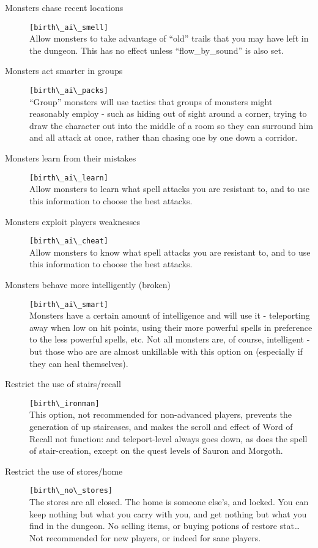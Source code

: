 \begin{description}
\item[Monsters chase recent locations] \verb+[birth\_ai\_smell]+\\
     Allow monsters to take advantage of ``old'' trails that you may have left
     in the dungeon. This has no effect unless ``flow\_by\_sound'' is also set.

\item[Monsters act smarter in groups] \verb+[birth\_ai\_packs]+\\
     ``Group'' monsters will use tactics that groups of monsters might
     reasonably employ - such as hiding out of sight around a corner,
     trying to draw the character out into the middle of a room so they
     can surround him and all attack at once, rather than chasing one
     by one down a corridor.

\item[Monsters learn from their mistakes] \verb+[birth\_ai\_learn]+\\
     Allow monsters to learn what spell attacks you are resistant to,
     and to use this information to choose the best attacks.

\item[Monsters exploit players weaknesses] \verb+[birth\_ai\_cheat]+\\
     Allow monsters to know what spell attacks you are resistant to,
     and to use this information to choose the best attacks.

 \item[Monsters behave more intelligently (broken)]
 \verb+[birth\_ai\_smart]+\\
     Monsters have a certain amount of intelligence and will use it -
     teleporting away when low on hit points, using their more powerful
     spells in preference to the less powerful spells, etc. Not all
     monsters are, of course, intelligent - but those who are are almost
     unkillable with this option on (especially if they can heal
     themselves).

\item[Restrict the use of stairs/recall] \verb+[birth\_ironman]+\\
     This option, not recommended for non-advanced players, prevents the
     generation of up staircases, and makes the scroll and effect of Word
     of Recall not function: and teleport-level always goes down, as does
     the spell of stair-creation, except on the quest levels of Sauron and
     Morgoth.

\item[Restrict the use of stores/home] \verb+[birth\_no\_stores]+\\
     The stores are all closed. The home is someone else's, and locked. You
     can keep nothing but what you carry with you, and get nothing but what
     you find in the dungeon. No selling items, or buying potions of
     restore stat\ldots Not recommended for new players, or indeed for
     sane players.


\end{description}
